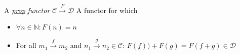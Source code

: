 A \href{doc/1 math/Seven Sketches in Compositionality/Chapter 5: Signal flow graphs/2 Props and presentations/1 Props - definition and first examples/1 Prop}{\emph{prop}} \emph{functor} $\mathcal{C} \xrightarrow F \mathcal{D}$
A functor for which
\begin{itemize}
  \item $\forall n \in \mathbb{N}: F(n)=n$
  \item For all $m_1 \xrightarrow f m_2$ and $n_1 \xrightarrow g n_2 \in \mathcal{C}$: $F(f))+F(g)=F(f+g) \in \mathcal{D}$
\end{itemize}

